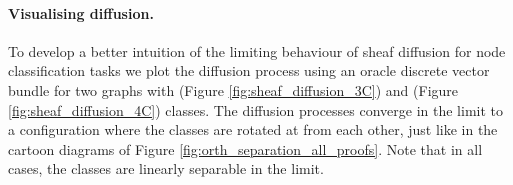 \documentclass{article}
\begin{document}
\begin{table*}[ht]
    \centering
    \caption{Ablation study for positional encodings. Positional encodings improve performance on some of our models.}
    \label{tab:pos_enc}
\end{table*} 

\paragraph{Visualising diffusion.} To develop a better intuition of the limiting behaviour of sheaf diffusion for node classification tasks we plot the diffusion process using an oracle discrete vector bundle for two graphs with  (Figure \ref{fig:sheaf_diffusion_3C}) and  (Figure \ref{fig:sheaf_diffusion_4C}) classes. The diffusion processes converge in the limit to a configuration where the classes are rotated at  from each other, just like in the cartoon diagrams of Figure \ref{fig:orth_separation_all_proofs}. Note that in all cases, the classes are linearly separable in the limit. 
\end{document}

